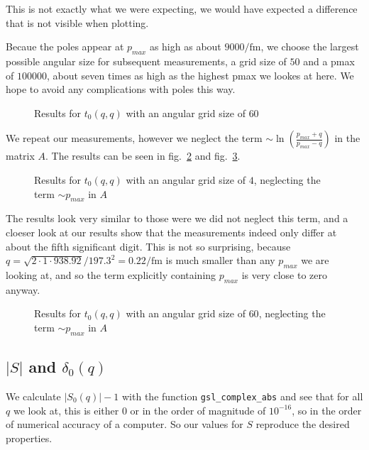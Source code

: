 \documentclass{scrartcl}
\begin{document}
This is not exactly what we were expecting, we would have expected a difference that is not visible when plotting. 

Becaue the poles appear at $p_{max}$ as high as about $9000\si{\per\femto\meter}$, we choose the largest possible angular size for subsequent measurements, a grid size of $50$ and a pmax of $100000$, about seven times as high as the highest pmax we lookes at here. We hope to avoid any complications with poles this way.

\begin{figure}[htbp]
	
	\caption{Results for $t_0(q,q)$ with an angular grid size of $60$}
	\label{fig:tnnbigangsize}
\end{figure}

We repeat our measurements, however we neglect the term $\sim \ln\left(\frac{p_{max}+q}{p_{max}-q}\right)$ in the matrix $A$. The results can be seen in fig.~\ref{fig:tnnsmallangsizewopm} and fig.~\ref{fig:tnnbigangsizewopm}. 

\begin{figure}[htbp]
	
	\caption{Results for $t_0(q,q)$ with an angular grid size of $4$, neglecting the term $\sim p_{max}$ in $A$}
	\label{fig:tnnsmallangsizewopm}
\end{figure}

The results look very similar to those were we did not neglect this term, and a cloeser look at our results show that the measurements indeed only differ at about the fifth significant digit. This is not so surprising, because $q=\sqrt{2\cdot1\cdot 938.92}/197.3^2=0.22\si{\per\femto\meter}$ is much smaller than any $p_{max}$ we are looking at, and so the term explicitly containing $p_{max}$ is very close to zero anyway.

\begin{figure}[htbp]
	
	\caption{Results for $t_0(q,q)$ with an angular grid size of $60$, neglecting the term $\sim p_{max}$ in $A$}
	\label{fig:tnnbigangsizewopm}
\end{figure}

\subsection{$|S|$ and $\delta_0(q)$}
We calculate $|S_0(q)|-1$ with the function \texttt{gsl\_complex\_abs} and see that for all $q$ we look at, this is either 0 or in the order of magnitude of $10^{-16}$, so in the order of numerical accuracy of a computer. So our values for $S$ reproduce the desired properties. 
\end{document}
